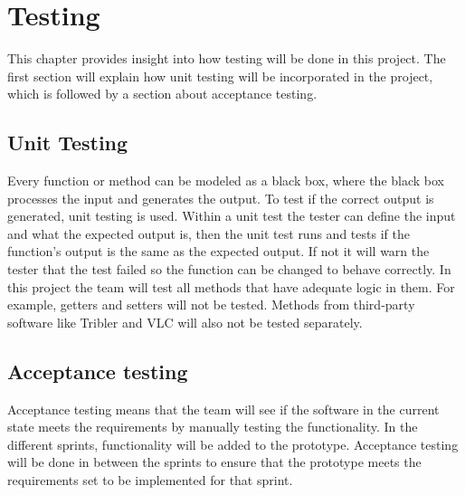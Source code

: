\chapter{Testing}
\label{sec:test}
This chapter provides insight into how testing will be done in this project. The first section will explain how unit testing will be incorporated  in the project, which is followed by a section about acceptance testing.

\section{Unit Testing}
Every function or method can be modeled as a black box, where the black box processes the input and generates the output. To test if the correct output is generated, unit testing is used. Within a unit test the tester can define the input and what the expected output is, then the unit test runs and tests if the function's output is the same as the expected output. If not it will warn the tester that the test failed so the function can be changed to behave correctly. 
In this project the team will test all methods that have adequate logic in them. For example, getters and setters will not be tested. Methods from third-party software like Tribler and VLC will also not be tested separately. 

\section{Acceptance testing}
Acceptance testing means that the team will see if the software in the current state meets the requirements by manually testing the functionality. In the different sprints, functionality will be added to the prototype. Acceptance testing will be done in between the sprints to ensure that the prototype meets the requirements set to be implemented for that sprint.